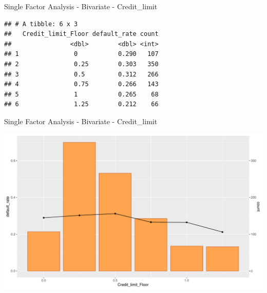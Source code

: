 \documentclass[9pt,ignorenonframetext,]{beamer}
\begin{document}
\begin{frame}[fragile]{Single Factor Analysis - Bivariate -
Credit\_limit}

\begin{verbatim}
## # A tibble: 6 x 3
##   Credit_limit_Floor default_rate count
##                <dbl>        <dbl> <int>
## 1               0           0.290   107
## 2               0.25        0.303   350
## 3               0.5         0.312   266
## 4               0.75        0.266   143
## 5               1           0.265    68
## 6               1.25        0.212    66
\end{verbatim}

\end{frame}

\begin{frame}{Single Factor Analysis - Bivariate - Credit\_limit}

\includegraphics{Risk-Models-Development-Process_files/figure-beamer/unnamed-chunk-35-1.pdf}

\end{frame}
\end{document}
